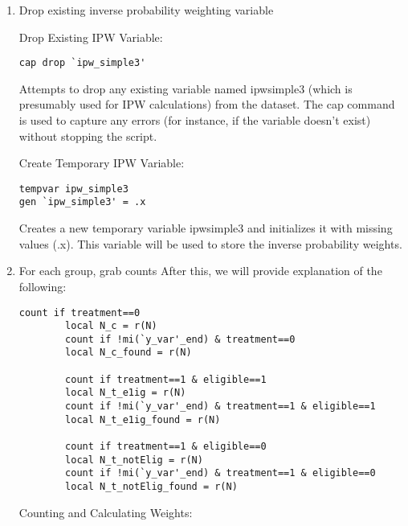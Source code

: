 \documentclass{article}
\begin{document}
\begin{enumerate}
    \item Drop existing inverse probability weighting variable\newline

Drop Existing IPW Variable:
\begin{mdframed}
\begin{verbatim}
cap drop `ipw_simple3'
\end{verbatim}
\end{mdframed}

\vspace{0.2cm}
Attempts to drop any existing variable named ipwsimple3 (which is presumably used for IPW calculations) from the dataset. The cap command is used to capture any errors (for instance, if the variable doesn’t exist) without stopping the script.\newline

Create Temporary IPW Variable:

\begin{mdframed}
\begin{verbatim}
tempvar ipw_simple3
gen `ipw_simple3' = .x
\end{verbatim}
\end{mdframed}

\vspace{0.2cm} Creates a new temporary variable ipwsimple3 and initializes it with missing values (.x). This variable will be used to store the inverse probability weights.


\item For each group, grab counts \newline
After this, we will provide explanation of the following: 

\begin{mdframed}
\begin{verbatim}
count if treatment==0 
		local N_c = r(N)			
		count if !mi(`y_var'_end) & treatment==0 
		local N_c_found = r(N)
		
		count if treatment==1 & eligible==1
		local N_t_e1ig = r(N)
		count if !mi(`y_var'_end) & treatment==1 & eligible==1
		local N_t_e1ig_found = r(N)
		
		count if treatment==1 & eligible==0
		local N_t_notElig = r(N)
		count if !mi(`y_var'_end) & treatment==1 & eligible==0
		local N_t_notElig_found = r(N)
\end{verbatim}
\end{mdframed}

\vspace{0.3cm}Counting and Calculating Weights:


\end{enumerate}
\end{document}
